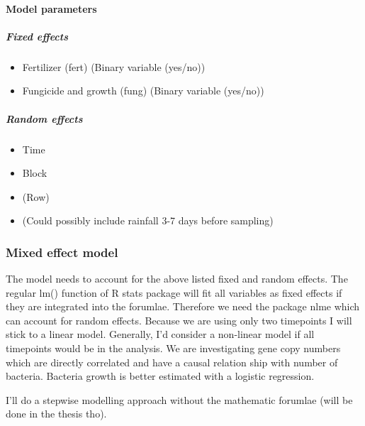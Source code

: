 \documentclass[twoside,12pt,final]{ucthesis-CA2012}
\providecommand{\tightlist}{%
  \setlength{\itemsep}{0pt}\setlength{\parskip}{0pt}}
\begin{document}
\begin{ucmainmatter}
\hypertarget{model-parameters}{%
\paragraph{Model parameters}\label{model-parameters}}

\hypertarget{fixed-effects}{%
\subparagraph{Fixed effects}\label{fixed-effects}}
\begin{itemize}
\tightlist
\item
  Fertilizer (fert) (Binary variable (yes/no))
\item
  Fungicide and growth (fung) (Binary variable (yes/no))
\end{itemize}
\hypertarget{random-effects}{%
\subparagraph{Random effects}\label{random-effects}}
\begin{itemize}
\tightlist
\item
  Time
\item
  Block
\item
  (Row)
\item
  (Could possibly include rainfall 3-7 days before sampling)
\end{itemize}
\hypertarget{mixed-effect-model}{%
\subsubsection{Mixed effect model}\label{mixed-effect-model}}

The model needs to account for the above listed fixed and random effects. The regular lm() function of R stats package will fit all variables as fixed effects if they are integrated into the forumlae. Therefore we need the package nlme which can account for random effects. Because we are using only two timepoints I will stick to a linear model. Generally, I'd consider a non-linear model if all timepoints would be in the analysis. We are investigating gene copy numbers which are directly correlated and have a causal relation ship with number of bacteria. Bacteria growth is better estimated with a logistic regression.

I'll do a stepwise modelling approach without the mathematic forumlae (will be done in the thesis tho).

\hypertarget{all-main-effects-interaction-full-model}{%
}
\end{ucmainmatter}
\end{document}
